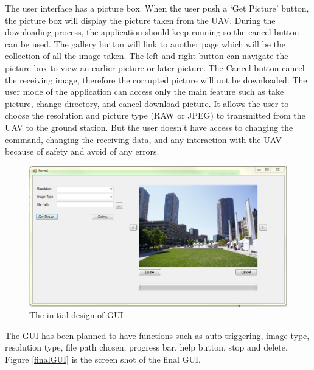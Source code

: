 The user interface has a picture box. When the user push a ‘Get Picture’ button, the picture box will display the picture taken from the UAV. During the downloading process, the application should keep running so the cancel button can be used. 
The gallery button will link to another page which will be the collection of all the image taken. The left and right button can navigate the picture box to view an earlier picture or later picture. 
The Cancel button cancel the receiving image, therefore the corrupted picture will not be downloaded. The user mode of the application can access only the main feature such as take picture, change directory, and cancel download picture.  It allows the user to choose the resolution and picture type (RAW or JPEG) to transmitted from the UAV to the ground station. But the user doesn't have access to changing the command, changing the receiving data, and any interaction with the UAV because of safety and avoid of any errors. 
\begin{figure}[!hbtp]
\begin{center}
\includegraphics[scale=0.4]{figures/initialGUI.png} 
\end{center}
\caption{The initial design of GUI\label{ini_GUI}}
\end{figure}
The GUI has been planned to have functions such as auto triggering, image type, resolution type, file path chosen, progress bar, help button, stop and delete. Figure \ref{finalGUI} is the screen shot of the final GUI.

